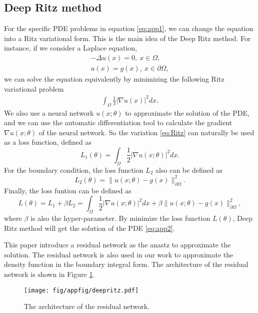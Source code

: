 \documentclass[hyperref]{article}
\numberwithin{equation}{section}
\theoremstyle{nonumberplain}
\begin{document}
	\subsection{Deep Ritz method}
	For the specific PDE problems in equation \eqref{eq:app1}, we can change the equation into a Ritz variational form. This is the main idea of the Deep Ritz method\cite{weinan2018deep}. For instance, if we consider a Laplace equation,
	\begin{equation}
		\begin{aligned}
			-\Delta u(x)=0,\ x\in\Omega,\\
			u(x) = g(x), \ x\in\partial\Omega,
		\end{aligned}
		\label{eq:app2}
	\end{equation}
	we can solve the equation equivalently by minimizing the following Ritz variational problem
	\begin{equation}
		\begin{aligned}
			\int_{\Omega}\frac{1}{2}|\nabla u(x) |^2 dx.
		\end{aligned}
		\label{eq:Ritz}
	\end{equation}
	We also use a neural network $u(x;\theta)$ to approximate the solution of the PDE, and we can use the automatic differentiation tool to calculate the gradient $\nabla u(x;\theta)$ of the neural network. So the variation \eqref{eq:Ritz} can naturally be used as a loss function, defined as  
	$$
	L_1(\theta) = \int_{\Omega}\frac{1}{2}|\nabla u(x;\theta) |^2 dx.
	$$
	For the boundary condition, the loss function $L_2$ also can be defined as 
	$$L_2(\theta)=\|u(x;\theta)-g(x)\|^2_{\partial\Omega}.$$
	Finally, the loss funtion can be defined as \begin{equation}
		L(\theta) = L_1+\beta L_2 =\int_\Omega\frac{1}{2}|\nabla u(x;\theta)|^2dx+\beta\|u(x;\theta)-g(x)\|^2_{\partial\Omega},
	\end{equation}  
	where $\beta$ is also the hyper-parameter. By minimize the loss function $L(\theta)$, Deep Ritz method will get the solution of the PDE \eqref{eq:app2}.
	
	This paper introduce a residual network as the anastz to approximate the solution. The residual network is also used in our work to approximate the density function in the boundary integral form. The architecture of the residual network is shown in Figure \ref{fig.ritz}.
	
	\begin{figure}[t]
		\centering
		\centering
		\texttt{[image: fig/appfig/deepritz.pdf]}
		\centering
		\caption{The architecture of the residual network.}
		\label{fig.ritz}
	\end{figure}
	
\end{document}

